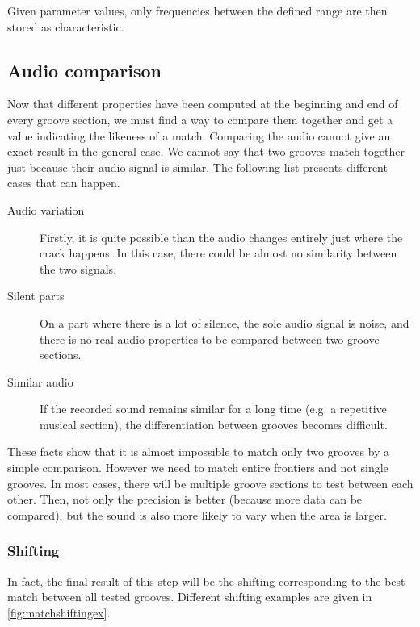 Given parameter values, only frequencies between the defined range are then stored as characteristic.

\subsection{Audio comparison}

Now that different properties have been computed at the beginning and end of every groove section, we must find a way to compare them together and get a value indicating the likeness of a match. Comparing the audio cannot give an exact result in the general case. We cannot say that two grooves match together just because their audio signal is similar. The following list presents different cases that can happen.

\begin{description}
\item[Audio variation] Firstly, it is quite possible than the audio changes entirely just where the crack happens. In this case, there could be almost no similarity between the two signals.
\item[Silent parts] On a part where there is a lot of silence, the sole audio signal is noise, and there is no real audio properties to be compared between two groove sections.
\item[Similar audio] If the recorded sound remains similar for a long time (e.g. a repetitive musical section), the differentiation between grooves becomes difficult.
\end{description}

These facts show that it is almost impossible to match only two grooves by a simple comparison. However we need to match entire frontiers and not single grooves. In most cases, there will be multiple groove sections to test between each other. Then, not only the precision is better (because more data can be compared), but the sound is also more likely to vary when the area is larger.

\subsubsection{Shifting}

In fact, the final result of this step will be the shifting corresponding to the best match between all tested grooves. Different shifting examples are given in \autoref{fig:matchshiftingex}.


